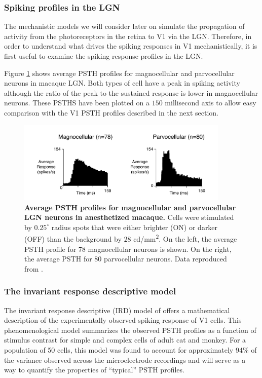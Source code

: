 \documentclass[phd,ianc,twoside]{infthesis}
\begin{document}
\subsubsection*{Spiking profiles in the LGN}


The mechanistic models we will consider later on simulate the
propagation of activity from the photoreceptors in the retina to V1 via
the LGN. Therefore, in order to understand what drives the spiking
responses in V1 mechanistically, it is first useful to examine the
spiking response profiles in the LGN.

Figure \ref{fig:LGN_PSTH_maunsell} shows average PSTH profiles for
magnocellular and parvocellular neurons in macaque LGN. Both types of
cell have a peak in spiking activity although the ratio of the peak to
the sustained response is lower in magnocellular neurons. These PSTHS
have been plotted on a $150$ millisecond axis to allow easy comparison
with the V1 PSTH profiles described in the next section.

\begin{figure}
\center
\includegraphics[width=0.9\textwidth]{./figures/LGN_PSTH_maunsell.pdf}
\caption{{\bf Average PSTH profiles for magnocellular and parvocellular
    LGN neurons in anesthetized macaque.} Cells were stimulated by
  $0.25^\circ$ radius spots that were either brighter (ON) or darker
  (OFF) than the background by $28$ \si{cd/mm^{2}}.  On the left, the
  average PSTH profile for 78 magnocellular neurons is shown. On the
  right, the average PSTH for 80 parvocellular neurons.  Data reproduced
  from \citet{maunsell_visneuro99}.}
\label{fig:LGN_PSTH_maunsell}
\end{figure}


\subsubsection*{The invariant response descriptive model}
\label{section:IRD_background}

The invariant response descriptive (IRD) model of
\citet{albrecht_jneurophys02} offers a mathematical description of the
experimentally observed spiking response of V1 cells. This
phenomenological model summarizes the observed PSTH profiles as a
function of stimulus contrast for simple and complex cells of adult cat
and monkey. For a population of 50 cells, this model was found to
account for approximately 94\% of the variance observed across the
microelectrode recordings and will serve as a way to quantify the
properties of ``typical'' PSTH profiles.
\end{document}
